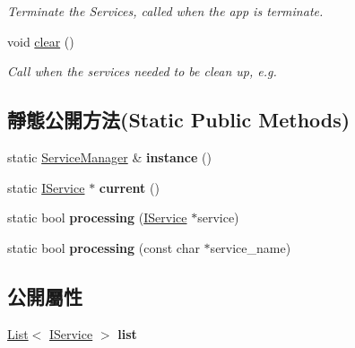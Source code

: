 \begin{DoxyCompactItemize}
\begin{DoxyCompactList}\small\item\em Terminate the Services, called when the app is terminate. \end{DoxyCompactList}\item 
void \hyperlink{class_i_dream_sky_1_1_service_manager_ab131108aa3b4270651541f65e7b3d7cb}{clear} ()
\begin{DoxyCompactList}\small\item\em Call when the services needed to be clean up, e.\+g. \end{DoxyCompactList}\end{DoxyCompactItemize}
\subsection*{靜態公開方法(Static Public Methods)}
\begin{DoxyCompactItemize}
\item 
static \hyperlink{class_i_dream_sky_1_1_service_manager}{Service\+Manager} \& {\bfseries instance} ()\hypertarget{class_i_dream_sky_1_1_service_manager_ad78e686a5fcf0c9a345fa67fd5128009}{}\label{class_i_dream_sky_1_1_service_manager_ad78e686a5fcf0c9a345fa67fd5128009}

\item 
static \hyperlink{class_i_dream_sky_1_1_i_service}{I\+Service} $\ast$ {\bfseries current} ()\hypertarget{class_i_dream_sky_1_1_service_manager_aa5e45ba30047395746a187172354c814}{}\label{class_i_dream_sky_1_1_service_manager_aa5e45ba30047395746a187172354c814}

\item 
static bool {\bfseries processing} (\hyperlink{class_i_dream_sky_1_1_i_service}{I\+Service} $\ast$service)\hypertarget{class_i_dream_sky_1_1_service_manager_ad109bb2cfd46435c4bc3642c7bf39247}{}\label{class_i_dream_sky_1_1_service_manager_ad109bb2cfd46435c4bc3642c7bf39247}

\item 
static bool {\bfseries processing} (const char $\ast$service\+\_\+name)\hypertarget{class_i_dream_sky_1_1_service_manager_a58315c8fd270bc63e2c7f7c432012c2a}{}\label{class_i_dream_sky_1_1_service_manager_a58315c8fd270bc63e2c7f7c432012c2a}

\end{DoxyCompactItemize}
\subsection*{公開屬性}
\begin{DoxyCompactItemize}
\item 
\hyperlink{class_i_dream_sky_1_1_list}{List}$<$ \hyperlink{class_i_dream_sky_1_1_i_service}{I\+Service} $>$ {\bfseries list}\hypertarget{class_i_dream_sky_1_1_service_manager_a8ed3c12315def9fb5af751013ebe748c}{}\label{class_i_dream_sky_1_1_service_manager_a8ed3c12315def9fb5af751013ebe748c}

\end{DoxyCompactItemize}


